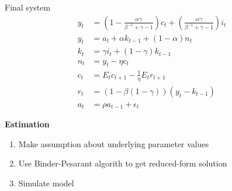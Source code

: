 \documentclass{beamer}
\begin{document}
\begin{frame}
 Final system
  \begin{align}
  y_t &= \left(1-\frac{\alpha \gamma}{\beta^{-1}+\gamma -1}\right)c_t +
  \left(\frac{\alpha \gamma}{\beta^{-1}+\gamma-1}\right)i_t\\
  y_t &= a_t +\alpha k_{t-1} + (1-\alpha)n_t\\
  k_t &= \gamma i_t + (1-\gamma)k_{t-1}\\
  n_t &= y_t-\eta c_t\\
  c_t &= E_t c_{t+1} - \frac{1}{\eta}E_t r_{t+1}\\
  r_t &= (1-\beta(1-\gamma))(y_t-k_{t-1})\\
  a_t &= \rho a_{t-1} + \epsilon_t
\end{align}
\end{frame}

\begin{frame}
  \textbf{Estimation}
  \begin{enumerate}
    \item Make assumption about underlying parameter values
    \item Use Binder-Pesarant algorith to get reduced-form solution
    \item Simulate model
  \end{enumerate} 
\end{frame}
\end{document}
